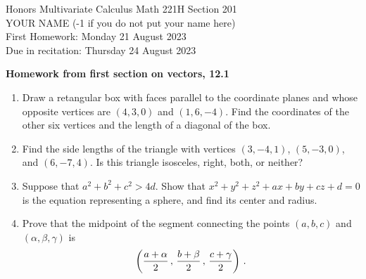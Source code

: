 \documentclass[12pt]{article}
\begin{document}
\LARGE 
\noindent
{\color{Maroon}Honors Multivariate Calculus \hfill Math 221H Section 201}\vspace{2pt}\\
\Large YOUR NAME (-1 if you do not put your name here)\vspace{2pt}\\
\large
First Homework: \hfill Monday 21 August 2023\\
Due in recitation: \hfill Thursday 24 August 2023\\

\normalsize

{\bf {\color{Maroon}Homework from first section on vectors, 12.1}}
\begin{enumerate}  %

\item Draw a retangular box with faces parallel to the coordinate planes and whose opposite vertices are $(4,3,0)$ and $(1,6,-4)$.
  Find the coordinates of the other six vertices and the length of a diagonal of the box.

\item Find the side lengths of the triangle with vertices
  $(3,-4,1)$, $(5,-3,0)$, and $(6,-7,4)$.
  Is this triangle isosceles, right, both, or neither?

\item Suppose that $a^2+b^2+c^2>4d$.
  Show that  $ x^2+y^2+z^2+ax+by+cz+d=0$
  is the equation representing a sphere, and find its center and radius.

\item Prove that the midpoint of the segment connecting the points $(a,b,c)$ and $(\alpha,\beta,\gamma)$ is\vspace{-10pt}
  \[ \left( \frac{a+\alpha}{2}\,,\, \frac{b+\beta}{2}\,,\, \frac{c+\gamma}{2}\right)\,.\vspace{-10pt}\]


\end{enumerate}
\end{document}
